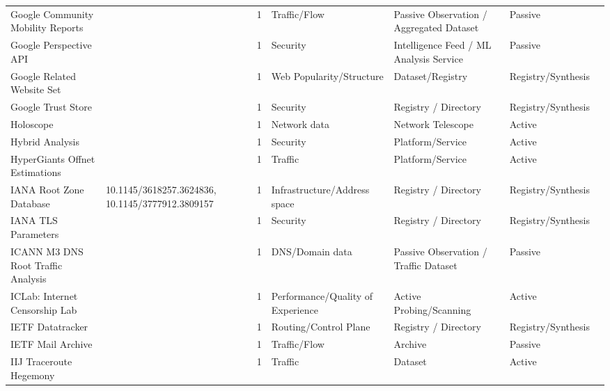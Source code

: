 \begin{table}[h!]
\begin{tabular}{lllllll}
Google Community Mobility Reports & \cite{google_mobility} & 1 & Traffic/Flow & Passive Observation / Aggregated Dataset & Passive & \cite{10.1145/3487552.3487831} \\
Google Perspective API & \cite{perspective_api} & 1 & Security & Intelligence Feed / ML Analysis Service & Passive & \cite{10.1145/3618257.3624820} \\
Google Related Website Set & \cite{related} & 1 & Web Popularity/Structure & Dataset/Registry & Registry/Synthesis & \cite{10.1145/3646547.3689026} \\
Google Trust Store & \cite{google_trust_store} & 1 & Security & Registry / Directory & Registry/Synthesis & \cite{10.1007/978-3-031-28486-1_4} \\
Holoscope & \cite{holoscope} & 1 & Network data & Network Telescope & Active & \cite{10.1145/3777912.3839810} \\
Hybrid Analysis & \cite{hybrid} & 1 & Security & Platform/Service & Active & \cite{10.1145/3777912.3809151} \\
HyperGiants Offnet Estimations & \cite{10.1145/3452296.3472928} & 1 & Traffic & Platform/Service & Active & \cite{10.1145/3777912.3839831} \\
IANA Root Zone Database & 10.1145/3618257.3624836, 10.1145/3777912.3809157 & 1 & Infrastructure/Address space & Registry / Directory & Registry/Synthesis & \cite{10.1145/3618257.3624836} \\
IANA TLS Parameters & \cite{iana_tls_parameters} & 1 & Security & Registry / Directory & Registry/Synthesis & \cite{10.1007/978-3-031-28486-1_6} \\
ICANN M3 DNS Root Traffic Analysis & \cite{icann_m3_dns} & 1 & DNS/Domain data & Passive Observation / Traffic Dataset & Passive & \cite{10.1007/978-3-031-28486-1_21} \\
ICLab: Internet Censorship Lab & \cite{iclab} & 1 & Performance/Quality of Experience & Active Probing/Scanning & Active & \cite{10.1007/978-3-030-98785-5_23} \\
IETF Datatracker & \cite{ietf_datatracker} & 1 & Routing/Control Plane & Registry / Directory & Registry/Synthesis & \cite{10.1145/3487552.3487821} \\
IETF Mail Archive & \cite{ietf_mail_archive} & 1 & Traffic/Flow & Archive & Passive & \cite{10.1145/3487552.3487821} \\
IIJ Traceroute Hegemony & \cite{10.1007/978-3-031-56252-5_10} & 1 & Traffic & Dataset & Active & \cite{10.1145/3777912.3839831} \\

\end{tabular}
\end{table}
